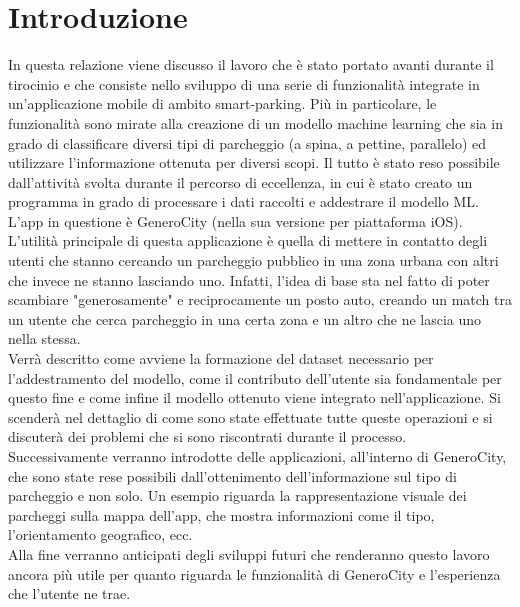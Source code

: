 \chapter*{Introduzione}
In questa relazione viene discusso il lavoro che è stato
portato avanti durante il tirocinio e che consiste nello
sviluppo di una serie di funzionalità integrate in un'applicazione
mobile di ambito smart-parking. Più in particolare, le funzionalità
sono mirate alla creazione di un modello machine learning che
sia in grado di classificare diversi tipi di parcheggio (a spina,
a pettine, parallelo) ed utilizzare l'informazione ottenuta 
per diversi scopi. Il tutto è stato reso possibile dall'attività
svolta durante il percorso di eccellenza, in cui è stato creato
un programma in grado di processare i dati raccolti e addestrare il 
modello ML.\\
L'app in questione è GeneroCity (nella sua versione per piattaforma
iOS). L'utilità principale di questa applicazione è quella di 
mettere in contatto degli utenti che stanno cercando un parcheggio
pubblico in una zona urbana con altri che invece ne stanno lasciando
uno. Infatti, l'idea di base sta nel fatto di poter scambiare
"generosamente" e reciprocamente un posto auto, creando un match tra un utente
che cerca parcheggio in una certa zona e un altro che ne lascia uno
nella stessa.\\
Verrà descritto come avviene la formazione del dataset necessario per
l'addestramento del modello, come il contributo dell'utente sia 
fondamentale per questo fine e come infine il modello ottenuto viene
integrato nell'applicazione. Si scenderà nel dettaglio di come sono
state effettuate tutte queste operazioni e si discuterà dei problemi
che si sono riscontrati durante il processo.\\
Successivamente verranno introdotte delle applicazioni, all'interno di 
GeneroCity, che sono state rese possibili dall'ottenimento 
dell'informazione sul tipo di parcheggio e non solo. Un esempio
riguarda la rappresentazione visuale dei parcheggi sulla mappa
dell'app, che mostra informazioni come il tipo, l'orientamento geografico, ecc.\\
Alla fine verranno anticipati degli sviluppi futuri che renderanno
questo lavoro ancora più utile per quanto riguarda le funzionalità
di GeneroCity e l'esperienza che l'utente ne trae.